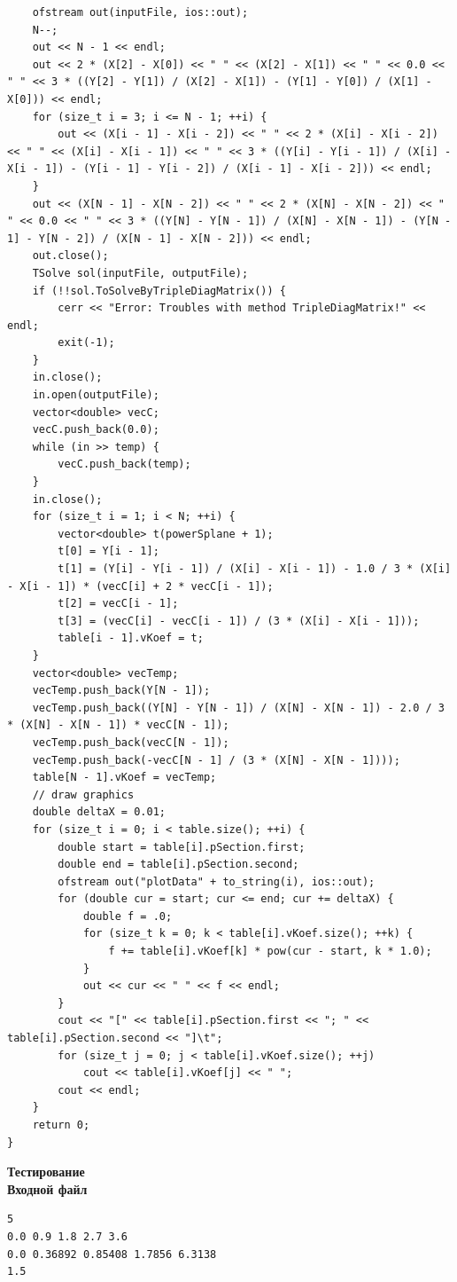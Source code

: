 \begin{lstlisting}
	ofstream out(inputFile, ios::out);
	N--;	
	out << N - 1 << endl;
	out << 2 * (X[2] - X[0]) << " " << (X[2] - X[1]) << " " << 0.0 << " " << 3 * ((Y[2] - Y[1]) / (X[2] - X[1]) - (Y[1] - Y[0]) / (X[1] - X[0])) << endl;
	for (size_t i = 3; i <= N - 1; ++i) {
		out << (X[i - 1] - X[i - 2]) << " " << 2 * (X[i] - X[i - 2]) << " " << (X[i] - X[i - 1]) << " " << 3 * ((Y[i] - Y[i - 1]) / (X[i] - X[i - 1]) - (Y[i - 1] - Y[i - 2]) / (X[i - 1] - X[i - 2])) << endl;
	}
	out << (X[N - 1] - X[N - 2]) << " " << 2 * (X[N] - X[N - 2]) << " " << 0.0 << " " << 3 * ((Y[N] - Y[N - 1]) / (X[N] - X[N - 1]) - (Y[N - 1] - Y[N - 2]) / (X[N - 1] - X[N - 2])) << endl;
	out.close();
	TSolve sol(inputFile, outputFile);
	if (!!sol.ToSolveByTripleDiagMatrix()) {
		cerr << "Error: Troubles with method TripleDiagMatrix!" << endl;
		exit(-1);
	}
	in.close();
	in.open(outputFile);
	vector<double> vecC;
	vecC.push_back(0.0);
	while (in >> temp) {
		vecC.push_back(temp);
	}
	in.close();
	for (size_t i = 1; i < N; ++i) {
		vector<double> t(powerSplane + 1);
		t[0] = Y[i - 1];
		t[1] = (Y[i] - Y[i - 1]) / (X[i] - X[i - 1]) - 1.0 / 3 * (X[i] - X[i - 1]) * (vecC[i] + 2 * vecC[i - 1]);
		t[2] = vecC[i - 1];
		t[3] = (vecC[i] - vecC[i - 1]) / (3 * (X[i] - X[i - 1]));
		table[i - 1].vKoef = t;	
 	}
 	vector<double> vecTemp;
 	vecTemp.push_back(Y[N - 1]);
 	vecTemp.push_back((Y[N] - Y[N - 1]) / (X[N] - X[N - 1]) - 2.0 / 3 * (X[N] - X[N - 1]) * vecC[N - 1]);
 	vecTemp.push_back(vecC[N - 1]);
 	vecTemp.push_back(-vecC[N - 1] / (3 * (X[N] - X[N - 1])));
 	table[N - 1].vKoef = vecTemp;
	// draw graphics
	double deltaX = 0.01;	
	for (size_t i = 0; i < table.size(); ++i) {
		double start = table[i].pSection.first;
		double end = table[i].pSection.second;
		ofstream out("plotData" + to_string(i), ios::out);
		for (double cur = start; cur <= end; cur += deltaX) {
			double f = .0;
			for (size_t k = 0; k < table[i].vKoef.size(); ++k) {
				f += table[i].vKoef[k] * pow(cur - start, k * 1.0);
			}
			out << cur << " " << f << endl;
		}
		cout << "[" << table[i].pSection.first << "; " << table[i].pSection.second << "]\t";
		for (size_t j = 0; j < table[i].vKoef.size(); ++j)
			cout << table[i].vKoef[j] << " ";
		cout << endl;
	}	
	return 0;
}
\end{lstlisting}
\vspace{0.5cm}

\textbf{Тестирование}\\

\textbf{Входной файл}
\begin{verbatim}
5
0.0 0.9 1.8 2.7 3.6
0.0 0.36892 0.85408 1.7856 6.3138
1.5
\end{verbatim}

